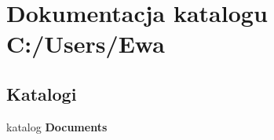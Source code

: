 \section{Dokumentacja katalogu C\+:/\+Users/\+Ewa}
\label{dir_7b4b22303ccca75992fbf3e5c534d687}
\subsection*{Katalogi}
\begin{DoxyCompactItemize}
\item 
katalog \textbf{ Documents}
\end{DoxyCompactItemize}
